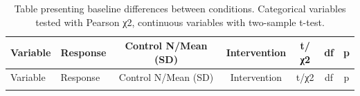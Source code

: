 \documentclass[]{article}
\begin{document}
\begin{longtable}[]{@{}llccccc@{}}
\caption{Table presenting baseline differences between conditions. Categorical variables tested with Pearson χ2, continuous variables with two-sample t-test.}\tabularnewline
\toprule
\begin{minipage}[b]{0.09\columnwidth}\raggedright
Variable\strut
\end{minipage} & \begin{minipage}[b]{0.24\columnwidth}\raggedright
Response\strut
\end{minipage} & \begin{minipage}[b]{0.16\columnwidth}\centering
Control N/Mean (SD)\strut
\end{minipage} & \begin{minipage}[b]{0.12\columnwidth}\centering
Intervention\strut
\end{minipage} & \begin{minipage}[b]{0.07\columnwidth}\centering
t/χ2\strut
\end{minipage} & \begin{minipage}[b]{0.06\columnwidth}\centering
df\strut
\end{minipage} & \begin{minipage}[b]{0.07\columnwidth}\centering
p\strut
\end{minipage}\tabularnewline
\midrule
\endfirsthead
\toprule
\begin{minipage}[b]{0.09\columnwidth}\raggedright
Variable\strut
\end{minipage} & \begin{minipage}[b]{0.24\columnwidth}\raggedright
Response\strut
\end{minipage} & \begin{minipage}[b]{0.16\columnwidth}\centering
Control N/Mean (SD)\strut
\end{minipage} & \begin{minipage}[b]{0.12\columnwidth}\centering
Intervention\strut
\end{minipage} & \begin{minipage}[b]{0.07\columnwidth}\centering
t/χ2\strut
\end{minipage} & \begin{minipage}[b]{0.06\columnwidth}\centering
df\strut
\end{minipage} & \begin{minipage}[b]{0.07\columnwidth}\centering
p\strut
\end{minipage}\tabularnewline
\midrule
\endhead
\begin{minipage}[t]{0.09\columnwidth}\raggedright

\end{minipage}
\end{longtable}
\end{document}
